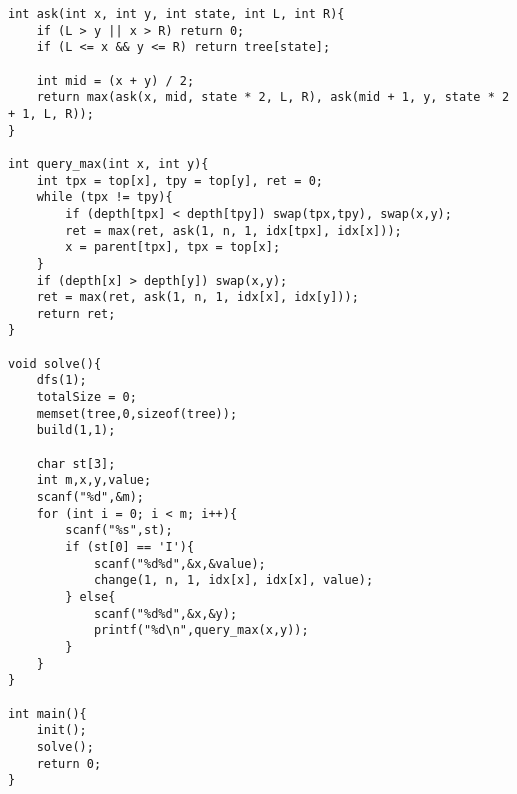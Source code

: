 \begin{verbatim}
int ask(int x, int y, int state, int L, int R){
    if (L > y || x > R) return 0;
    if (L <= x && y <= R) return tree[state];

    int mid = (x + y) / 2;
    return max(ask(x, mid, state * 2, L, R), ask(mid + 1, y, state * 2 + 1, L, R));
}

int query_max(int x, int y){
    int tpx = top[x], tpy = top[y], ret = 0;
    while (tpx != tpy){
        if (depth[tpx] < depth[tpy]) swap(tpx,tpy), swap(x,y);
        ret = max(ret, ask(1, n, 1, idx[tpx], idx[x]));
        x = parent[tpx], tpx = top[x];
    }
    if (depth[x] > depth[y]) swap(x,y);
    ret = max(ret, ask(1, n, 1, idx[x], idx[y]));
    return ret;
}

void solve(){
    dfs(1);
    totalSize = 0;
    memset(tree,0,sizeof(tree));
    build(1,1);

    char st[3];
    int m,x,y,value;
    scanf("%d",&m);
    for (int i = 0; i < m; i++){
        scanf("%s",st);
        if (st[0] == 'I'){
            scanf("%d%d",&x,&value);
            change(1, n, 1, idx[x], idx[x], value);
        } else{
            scanf("%d%d",&x,&y);
            printf("%d\n",query_max(x,y));
        }
    }
}

int main(){
    init();
    solve();
    return 0;
}
\end{verbatim}
